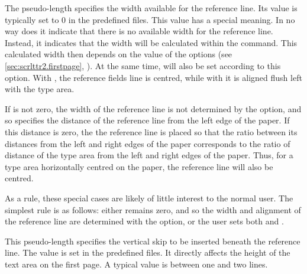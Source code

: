 \begin{Declaration}
\end{Declaration}
The  pseudo-length specifies the width available for the
reference line. Its value is typically set to 0 in the predefined
 files.
This value has a special meaning. In no way does it
indicate that there is no available width for the reference line. Instead, it
indicates that the width will be calculated within the
 command. This calculated
width then depends on the value of the %
%
 options (see
\autoref{sec:scrlttr2.firstpage}, ). At
the same time,  will also be set according to this option.
With %
, the reference fields line is
centred, while with %
 it is aligned flush left with the
type area.

If  is not zero, the width of the reference line is not
determined by the   option, and so
 specifies the distance of the reference line from the left
edge of the paper. If this distance is zero, the the
reference line is placed so that the ratio between its distances from the left
and right edges of the paper corresponds to the ratio of distance of the type
area from the left and right edges of the paper. Thus, for a type area
horizontally centred on the paper, the reference line will also be centred.

As a rule, these special cases are likely of little interest to the normal
user. The simplest rule is as follows: either
 remains zero, and so the width and alignment of the
reference line are determined with the 
option, or the user sets both  and .%
\EndIndexGroup


\begin{Declaration}
\end{Declaration}
This pseudo-length specifies the vertical skip to be inserted beneath the
reference line. The value is set in the predefined 
files. It directly
affects the height of the text area on the first page. A typical value is
between one and two lines.%
\EndIndexGroup
%
\EndIndexGroup


